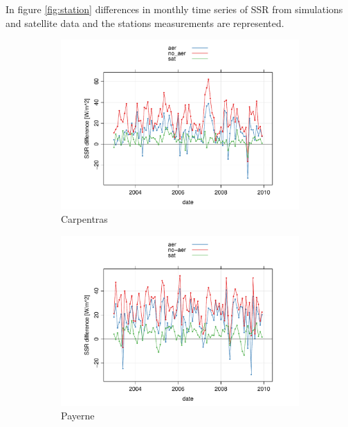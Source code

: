 In figure \ref{fig:station} differences in monthly time series of SSR from simulations and satellite data and the stations measurements are represented.

\begin{figure}[h!]
  \centering\begin{subfigure}{0.4\textwidth}
    \includegraphics[width=1.2\textwidth]{figs/capitulo6/CarpentrasMesesDif.pdf}
    \caption{Carpentras}
    \label{Carpentras}
  \end{subfigure}
  \centering\begin{subfigure}{0.4\textwidth}
    \includegraphics[width=1.2\textwidth]{figs/capitulo6/PayerneMesesDif.pdf}
    \caption{Payerne}
    \label{Payerne}
  \end{subfigure}
    \centering\begin{subfigure}{0.4\textwidth}

\end{subfigure}
\end{figure}
